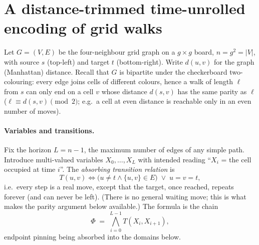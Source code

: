 
\section{A distance-trimmed time-unrolled encoding of grid walks}
\label{sec:trimmed-steps}

Let $G=(V,E)$ be the four-neighbour grid graph on a $g\times g$ board,
$n=g^2=|V|$, with source $s$ (top-left) and target $t$ (bottom-right).
Write $d(u,v)$ for the graph (Manhattan) distance. Recall that $G$ is
bipartite under the checkerboard two-colouring: every edge joins cells of
different colours, hence a walk of length $\ell$ from $s$ can only end on
a cell $v$ whose distance $d(s,v)$ has the same parity as $\ell$
($\ell \equiv d(s,v) \pmod 2$; e.g.\ a cell at even distance is reachable
only in an even number of moves).

\paragraph{Variables and transitions.}
Fix the horizon $L = n-1$, the maximum number of edges of any simple
path. Introduce multi-valued variables $X_0,\dots,X_L$ with intended
reading ``$X_i$ = the cell occupied at time $i$''. The \emph{absorbing
transition relation} is
\[
  T(u,v) \iff \bigl(u\neq t \wedge \{u,v\}\in E\bigr) \;\lor\; u=v=t ,
\]
i.e.\ every step is a real move, except that the target, once reached,
repeats forever (and can never be left). (There is no general waiting move; this is what makes
the parity argument below available.) The formula is the chain
\[
  \Phi \;=\; \bigwedge_{i=0}^{L-1} T(X_i, X_{i+1}),
\]
endpoint pinning being absorbed into the domains below.

